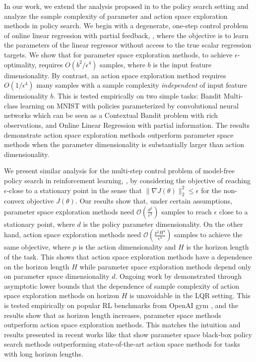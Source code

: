 In our work, we extend the analysis proposed in \citep{ghadimi2013stochastic} to the policy search setting 
%
%
and analyze the sample complexity of parameter and action space exploration methods in policy search. We begin with a degenerate, one-step control problem of online linear regression with partial feedback, \citep{flaxman2005online}, where the objective is to learn the parameters of the linear regressor without access to the true scalar regression targets. We show that for parameter space exploration methods, to achieve $\epsilon$-optimality, requires $O(b^2/\epsilon^4)$ samples, 
%
where $b$ is the input feature dimensionality. By contrast, an action space exploration method requires $O(1/\epsilon^4)$ many samples
%
with a sample complexity \textit{independent} of input feature dimensionality $b$. %
This is tested empirically on two simple tasks:  Bandit Multi-class learning on MNIST with policies parameterized by convolutional neural networks which can be seen as a Contextual Bandit problem with rich observations, and Online Linear Regression with partial information. The results demonstrate action space exploration methods outperform  parameter space methods when the parameter dimensionality is substantially larger than action dimensionality.

We present similar analysis for the multi-step control problem of model-free policy search in reinforcement learning, \citep{kober2013reinforcement}, by considering the objective of reaching $\epsilon$-close to a stationary point in the sense that $\|\nabla J(\theta)\|_2^2 \leq \epsilon$ for the non-convex objective $J(\theta)$. Our results show that, under certain assumptions, parameter space exploration methods 
%
need $\mathcal{O}(\frac{d^2}{\epsilon^3})$ samples to reach $\epsilon$ close to a stationary point, where $d$ is the policy parameter dimensionality. On the other hand, action space exploration methods need $\mathcal{O}(\frac{p^2H^4}{\epsilon^4})$ samples to achieve the same objective, where $p$ is the action dimensionality and $H$ is the horizon length of the task. This shows that action space exploration methods have a dependence on the horizon length $H$ %
while parameter space exploration methods depend only on parameter space dimensionality $d$.
%
Ongoing work by \cite{tu2018gap} demonstrated through asymptotic lower bounds that the dependence of sample complexity of action space exploration methods on horizon $H$ is unavoidable in the LQR setting.
This is tested empirically on popular RL benchmarks from OpenAI gym \citep{openaigym}, and the results show that as horizon length increases, parameter space methods outperform action space exploration methods. This matches the intuition and results presented in recent works like \citep{bagnell2001autonomous,szita2006learning,tesch2011using,salimans2017evolution, mania2018simple}
%
that show parameter space black-box policy search methods outperforming state-of-the-art action space methods for tasks with long horizon lengths.


